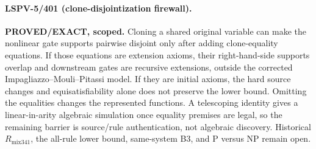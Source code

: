 \paragraph{LSPV-5/401 (clone-disjointization firewall).}
\textbf{PROVED/EXACT, scoped.}
Cloning a shared original variable can make the nonlinear gate supports pairwise
disjoint only after adding clone-equality equations.  If those equations are
extension axioms, their right-hand-side supports overlap and downstream gates
are recursive extensions, outside the corrected Impagliazzo--Mouli--Pitassi
model.  If they are initial axioms, the hard source changes and equisatisfiability
alone does not preserve the lower bound.  Omitting the equalities changes the
represented functions.  A telescoping identity gives a linear-in-arity
algebraic simulation once equality premises are legal, so the remaining barrier
is source/rule authentication, not algebraic discovery.  Historical
$R_{\mathrm{mix341}}$, the all-rule lower bound, same-system B3, and P versus NP
remain open.
